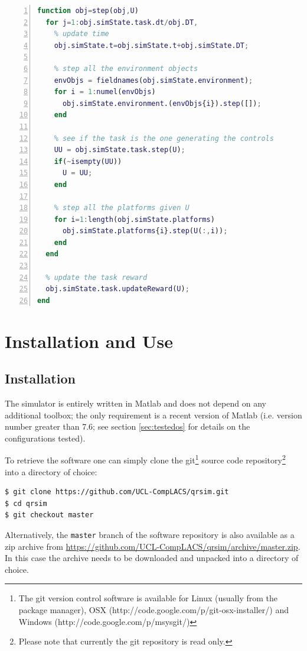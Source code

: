 \documentclass[a4paper,11pt]{report}
\newcommand{\sname}{QRSim\xspace}
\newcommand{\webrepo}{\url{https://github.com/UCL-CompLACS/qrsim/archive/master.zip}\xspace}
\begin{document}
\begin{lstlisting}[float=ht!bp,caption=\sname step() method,language=Matlab,frame=lines,label=lst:step,numbers=left,basicstyle=\small]
function obj=step(obj,U)
  for j=1:obj.simState.task.dt/obj.DT,
    % update time
    obj.simState.t=obj.simState.t+obj.simState.DT;
                
    % step all the environment objects
    envObjs = fieldnames(obj.simState.environment);
    for i = 1:numel(envObjs)
      obj.simState.environment.(envObjs{i}).step([]);
    end
                
    % see if the task is the one generating the controls
    UU = obj.simState.task.step(U);
    if(~isempty(UU))
      U = UU;
    end
                
    % step all the platforms given U
    for i=1:length(obj.simState.platforms)
      obj.simState.platforms{i}.step(U(:,i));
    end                
  end
       
  % update the task reward
  obj.simState.task.updateReward(U);
end
\end{lstlisting}


\chapter{Installation and Use}

\section{Installation}
The simulator is entirely written in Matlab and does not depend on any additional toolbox; the only requirement is a recent version of Matlab (i.e. version number greater  than 7.6; see section \ref{sec:testedos} for details on the configurations tested).

To retrieve the software one can simply clone the git\footnote{The git version control software is available for Linux (usually from the package manager), OSX (http://code.google.com/p/git-osx-installer/) and Windows (http://code.google.com/p/msysgit/)} source code repository\footnote{Please note that currently the git repository is read only.} into a directory of choice:
\begin{verbatim}
$ git clone https://github.com/UCL-CompLACS/qrsim.git
$ cd qrsim
$ git checkout master
\end{verbatim}
Alternatively, the \texttt{master} branch of the software repository is also available as a zip archive from \webrepo. In this case the archive needs to be downloaded and unpacked into a directory of choice.
\end{document}
